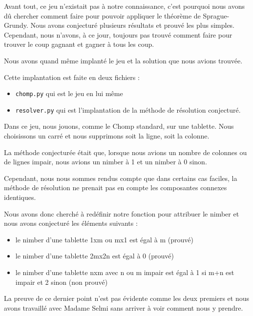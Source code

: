 Avant tout, ce jeu n'existait pas à notre connaissance, c'est pourquoi nous avons dû chercher comment faire pour pouvoir appliquer le théorème de Sprague-Grundy. Nous avons conjecturé plusieurs résultats et prouvé les plus simples. Cependant, nous n'avons, à ce jour, toujours pas trouvé comment faire pour trouver le coup gagnant et gagner à tous les coup.

Nous avons quand même implanté le jeu et la solution que nous avions trouvée. 

Cette implantation est faite en deux fichiers :
\begin{itemize}
  \item \texttt{chomp.py} qui est le jeu en lui même
  \item \texttt{resolver.py} qui est l'implantation de la méthode de résolution conjecturé.
\end{itemize}

Dans ce jeu, nous jouons, comme le Chomp standard, sur une tablette. Nous choisissons un carré et nous supprimons soit la ligne, soit la colonne. 

La méthode conjecturée était que, lorsque nous avions un nombre de colonnes ou de lignes impair, nous avions un nimber à 1 et un nimber à 0 sinon.

Cependant, nous nous sommes rendus compte que dans certains cas faciles, la méthode de résolution ne prenait pas en compte les composantes connexes identiques.

Nous avons donc cherché à redéfinir notre fonction pour attribuer le nimber et nous avons conjecturé les éléments suivants :
\begin{itemize}
  \item le nimber d'une tablette 1xm ou mx1 est égal à m (prouvé)
  \item le nimber d'une tablette 2mx2n est égal à 0 (prouvé)
  \item le nimber d'une tablette nxm avec n ou m impair est égal à 1 si m+n est impair et 2 sinon (non prouvé)
\end{itemize}

La preuve de ce dernier point n'est pas évidente comme les deux premiers et nous avons travaillé avec Madame Selmi sans arriver à voir comment nous y prendre.
